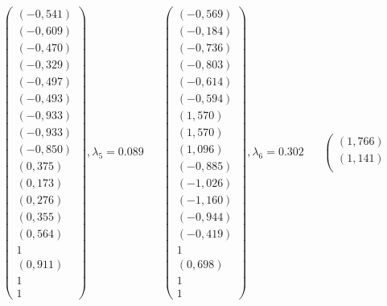 \documentclass[a5paper, 10pt]{article}
\theoremstyle{definition}
\theoremstyle{plain}
\theoremstyle{remark}
\begin{document}
\begin{equation*}
\left(\begin{matrix}
\left(-0,541\right) \\
\left(-0,609\right) \\
\left(-0,470\right) \\
\left(-0,329\right) \\
\left(-0,497\right) \\
\left(-0,493\right) \\
\left(-0,933\right) \\
\left(-0,933\right) \\
\left(-0,850\right) \\
\left(0,375\right) \\
\left(0,173\right) \\
\left(0,276\right) \\
\left(0,355\right) \\
\left(0,564\right) \\
1 \\
\left(0,911\right) \\
1 \\
1
\end{matrix}\right)
,  \lambda_ 5 = 0.089\,\,\,\,\,\,\,\,\,\,
\left(\begin{matrix}
\left(-0,569\right) \\
\left(-0,184\right) \\
\left(-0,736\right) \\
\left(-0,803\right) \\
\left(-0,614\right) \\
\left(-0,594\right) \\
\left(1,570\right) \\
\left(1,570\right) \\
\left(1,096\right) \\
\left(-0,885\right) \\
\left(-1,026\right) \\
\left(-1,160\right) \\
\left(-0,944\right) \\
\left(-0,419\right) \\
1 \\
\left(0,698\right) \\
1 \\
1
\end{matrix}\right)
,  \lambda_ 6 = 0.302\,\,\,\,\,\,\,\,\,\,
\left(\begin{matrix}
\left(1,766\right) \\
\left(1,141\right) \\

\end{matrix}
\end{equation*}
\end{document}
